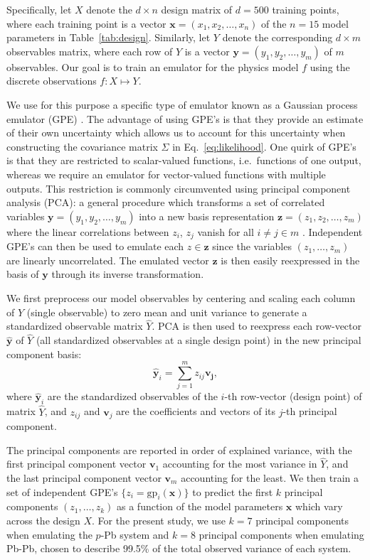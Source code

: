 \documentclass[aps,prc,reprint,amsmath,nofootinbib]{revtex4-1}
\newcommand{\xv}{\mathbf x}
\newcommand{\yv}{\mathbf y}
\newcommand{\zv}{\mathbf z}
\begin{document}
Specifically, let $X$ denote the ${d \times n}$ design matrix of $d=500$ training points, where each training point is a vector $\xv = (x_1, x_2, \dots, x_n)$ of the $n=15$ model parameters in Table~\ref{tab:design}.
Similarly, let $Y$ denote the corresponding ${d \times m}$ observables matrix, where each row of $Y$ is a vector $\yv = (y_1, y_2, \dots, y_m)$ of $m$ observables.
Our goal is to train an emulator for the physics model $f$ using the discrete observations $f: X \mapsto Y$.

We use for this purpose a specific type of emulator known as a Gaussian process emulator (GPE) \cite{Rasmussen:2006gp}.
The advantage of using GPE's is that they provide an estimate of their own uncertainty which allows us to account for this uncertainty when constructing the covariance matrix $\Sigma$ in Eq.~\eqref{eq:likelihood}.
One quirk of GPE's is that they are restricted to scalar-valued functions, i.e.\ functions of one output, whereas we require an emulator for vector-valued functions with multiple outputs.
This restriction is commonly circumvented using principal component analysis (PCA): a general procedure which transforms a set of correlated variables $\yv = (y_1, y_2, \dots, y_m)$ into a new basis representation $\zv = (z_1, z_2, \dots, z_m)$ where the linear correlations between $z_i$, $z_j$ vanish for all $i\ne j \in m$ \cite{Tipping:1999}.
Independent GPE's can then be used to emulate each $z \in \zv$ since the variables $(z_1, \dots, z_m)$ are linearly uncorrelated.
The emulated vector $\zv$ is then easily reexpressed in the basis of $\yv$ through its inverse transformation.

We first preprocess our model observables by centering and scaling each column of $Y$ (single observable) to zero mean and unit variance to generate a standardized observable matrix $\hat{Y}$.
PCA is then used to reexpress each row-vector $\hat{\yv}$ of $\hat{Y}$ (all standardized observables at a single design point) in the new principal component basis:
\begin{equation}
  \hat{\yv}_i = \sum\limits_{j=1}^m z_{ij} \mathbf{v_j},
\end{equation}
where $\hat{\yv}_i$ are the standardized observables of the $i$-th row-vector (design point) of matrix $\hat{Y}$, and $z_{ij}$ and $\mathbf{v}_j$ are the coefficients and vectors of its $j$-th principal component.

The principal components are reported in order of explained variance, with the first principal component vector $\mathbf{v}_1$ accounting for the most variance in $\hat{Y}$, and the last principal component vector $\mathbf{v}_m$ accounting for the least.
We then train a set of independent GPE's $\{z_i=\mathrm{gp}_i(\xv)\}$ to predict the first $k$ principal components $(z_1, \dots, z_k)$ as a function of the model parameters $\xv$ which vary across the design $X$.
For the present study, we use $k=7$ principal components when emulating the $p$-Pb system and $k=8$ principal components when emulating Pb-Pb, chosen to describe 99.5\% of the total observed variance of each system.
\end{document}
